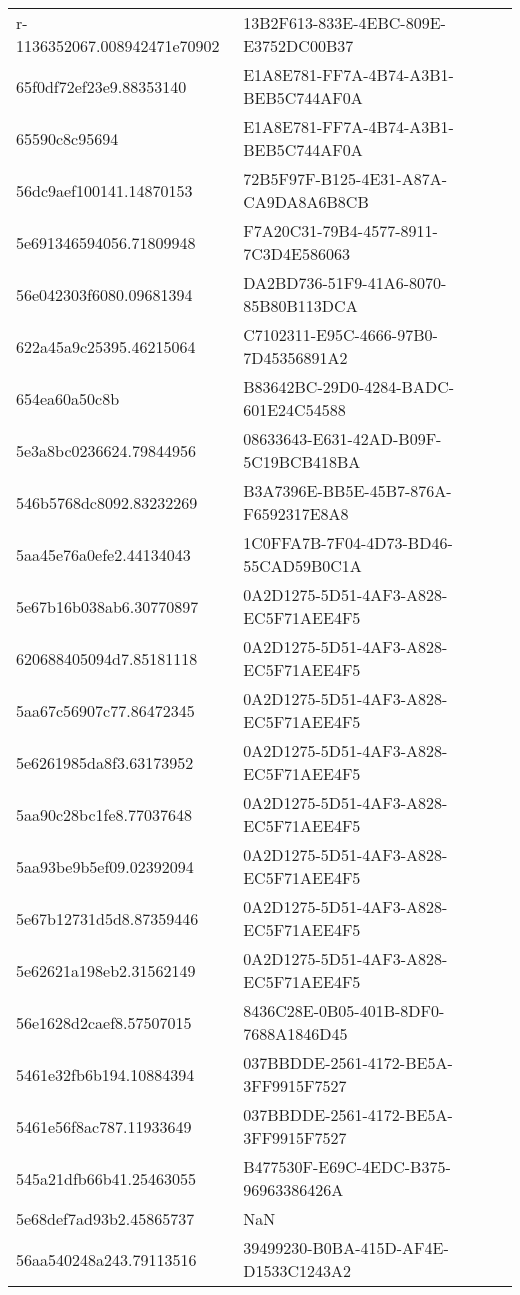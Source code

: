 \begin{tabular}{ll}
r-1136352067.008942471e70902 & 13B2F613-833E-4EBC-809E-E3752DC00B37 \\
65f0df72ef23e9.88353140 & E1A8E781-FF7A-4B74-A3B1-BEB5C744AF0A \\
65590c8c95694 & E1A8E781-FF7A-4B74-A3B1-BEB5C744AF0A \\
56dc9aef100141.14870153 & 72B5F97F-B125-4E31-A87A-CA9DA8A6B8CB \\
5e691346594056.71809948 & F7A20C31-79B4-4577-8911-7C3D4E586063 \\
56e042303f6080.09681394 & DA2BD736-51F9-41A6-8070-85B80B113DCA \\
622a45a9c25395.46215064 & C7102311-E95C-4666-97B0-7D45356891A2 \\
654ea60a50c8b & B83642BC-29D0-4284-BADC-601E24C54588 \\
5e3a8bc0236624.79844956 & 08633643-E631-42AD-B09F-5C19BCB418BA \\
546b5768dc8092.83232269 & B3A7396E-BB5E-45B7-876A-F6592317E8A8 \\
5aa45e76a0efe2.44134043 & 1C0FFA7B-7F04-4D73-BD46-55CAD59B0C1A \\
5e67b16b038ab6.30770897 & 0A2D1275-5D51-4AF3-A828-EC5F71AEE4F5 \\
620688405094d7.85181118 & 0A2D1275-5D51-4AF3-A828-EC5F71AEE4F5 \\
5aa67c56907c77.86472345 & 0A2D1275-5D51-4AF3-A828-EC5F71AEE4F5 \\
5e6261985da8f3.63173952 & 0A2D1275-5D51-4AF3-A828-EC5F71AEE4F5 \\
5aa90c28bc1fe8.77037648 & 0A2D1275-5D51-4AF3-A828-EC5F71AEE4F5 \\
5aa93be9b5ef09.02392094 & 0A2D1275-5D51-4AF3-A828-EC5F71AEE4F5 \\
5e67b12731d5d8.87359446 & 0A2D1275-5D51-4AF3-A828-EC5F71AEE4F5 \\
5e62621a198eb2.31562149 & 0A2D1275-5D51-4AF3-A828-EC5F71AEE4F5 \\
56e1628d2caef8.57507015 & 8436C28E-0B05-401B-8DF0-7688A1846D45 \\
5461e32fb6b194.10884394 & 037BBDDE-2561-4172-BE5A-3FF9915F7527 \\
5461e56f8ac787.11933649 & 037BBDDE-2561-4172-BE5A-3FF9915F7527 \\
545a21dfb66b41.25463055 & B477530F-E69C-4EDC-B375-96963386426A \\
5e68def7ad93b2.45865737 & NaN \\
56aa540248a243.79113516 & 39499230-B0BA-415D-AF4E-D1533C1243A2 \\

\end{tabular}
